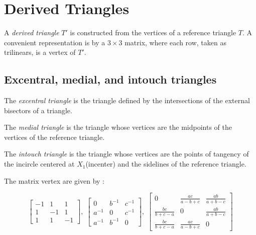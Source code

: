 \section{Derived Triangles}
\label{app:Aderived}

A {\em derived triangle} $T'$ is constructed from the vertices of  a reference triangle $T$. A convenient representation is by a $3\times  3$  matrix, where each row, taken as trilinears, is a vertex of $T'$.




\subsection{Excentral, medial, and intouch triangles}

The {\em  excentral triangle} is the triangle defined by the intersections of the external bisectors of a triangle.

\noindent The {\em medial triangle} is the triangle whose vertices are the midpoints of the vertices of the reference triangle.

\noindent The {\em intouch triangle}  is the triangle whose vertices are the points of tangency of the  incircle centered at $X_1$(incenter) and the sidelines of the reference triangle.



The matrix vertex are given by \cite{mw}: 



\begin{equation*}
\left[
\begin{matrix}
-1&1&1\\1&-1&1\\1&1&-1
\end{matrix}
\right],\;
\left[
\begin{matrix}
0&b^{-1}&c^{-1}\\a^{-1}&0&c^{-1}\\a^{-1}&b^{-1}&0
\end{matrix}
\right],\;
\left[
\begin{matrix}
0&\frac{a c}{a-b+c}&\frac{a b}{a+b-c}\\
\frac{b c}{ b+c-a}&0&\frac{a b}{a+b-c}\\
\frac{b c}{ b+c-a}&\frac{a c}{a-b+c}&0
\end{matrix}
\right]
\end{equation*}


